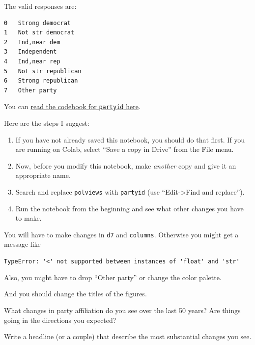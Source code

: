 The valid responses are:

\begin{lstlisting}[]
0   Strong democrat
1   Not str democrat
2   Ind,near dem
3   Independent
4   Ind,near rep
5   Not str republican
6   Strong republican
7   Other party
\end{lstlisting}

You can
\href{https://gssdataexplorer.norc.org/projects/52787/variables/141/vshow}{read
the codebook for \passthrough{\lstinline!partyid!} here}.

Here are the steps I suggest:

\begin{enumerate}
\def\labelenumi{\arabic{enumi})}
\item
  If you have not already saved this notebook, you should do that first.
  If you are running on Colab, select ``Save a copy in Drive'' from the
  File menu.
\item
  Now, before you modify this notebook, make \emph{another} copy and
  give it an appropriate name.
\item
  Search and replace \passthrough{\lstinline!polviews!} with
  \passthrough{\lstinline!partyid!} (use ``Edit-\textgreater Find and
  replace'').
\item
  Run the notebook from the beginning and see what other changes you
  have to make.
\end{enumerate}

You will have to make changes in \passthrough{\lstinline!d7!} and
\passthrough{\lstinline!columns!}. Otherwise you might get a message
like

\passthrough{\lstinline!TypeError: '<' not supported between instances of 'float' and 'str'!}

Also, you might have to drop ``Other party'' or change the color
palette.

And you should change the titles of the figures.

What changes in party affiliation do you see over the last 50 years? Are
things going in the directions you expected?

Write a headline (or a couple) that describe the most substantial
changes you see.

